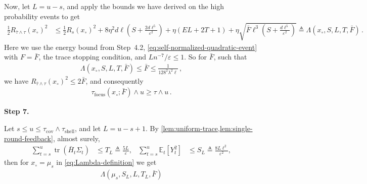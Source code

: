 \documentclass{article}
\newcommand{\proofstepinline}[1]{%
    {\normalfont\normalsize\bfseries\color{blue!55!black}Step #1.}\enspace
}
\newcommand{\E}{\mathbb E}
\newcommand{\tr}{\operatorname{tr}}
\newcommand{\1}{\mathbf 1}
\newcommand{\eps}{\varepsilon}
\begin{document}
Now, let $L = u - s$, and apply the bounds we have derived on the high probability events  to get
\begin{align}
    \frac{1}{2}R_{\bar{\tau}\wedge\tau}(x_{\circ})^2
     & \leq
    \frac{1}{2}R_s(x_{\circ})^2
    +8\eta^2d\ell\left(S+\frac{2d\ell^5}{\eps^2}\right)
    +\eta(EL+2T+1)
    +\eta\sqrt{\bar{F}\ell^3\left(S+\frac{d\ell^5}{\eps^2}\right)}
    \triangleq \Lambda(x_{\circ}, S, L, T, \bar{F})
    \,.
    \label{eq:Lambda-definition}
\end{align}
Here we use the energy bound from Step~4.2,
\eqref{eq:self-normalized-quadratic-event} with $F=\bar{F}$,
the trace stopping condition, and $Ln^{-7}/\eps\leq1$.
So for $\bar{F}$, such that
\begin{align}
    \Lambda(x_{\circ}, S, L, T, \bar{F})\leq \bar{F} \leq \frac{1}{128^2\lambda^2 \ell}\,,
\end{align}
we have $R_{\bar{\tau}\wedge \tau}(x_{\circ})^2 \leq 2\bar{F}$, and consequently
\begin{align}
    \tau_{\mathrm{focus}}(x_{\circ}; \bar{F}) \wedge u \geq \tau \wedge u\,.
\end{align}


\proofstepinline{7}
Let $s \leq u \leq \tau_{\mathrm{cov}} \wedge \tau_{\mathrm{shell}}$,
and let $L = u - s + 1$.
By \cref{lem:uniform-trace,lem:single-round-feedback}, almost surely,
\begin{align}
    \sum_{t=s}^{u}\tr(\bar{H}_t\Sigma_t)
     & \leq T_L\triangleq\frac{5L}{\eps},
     & \sum_{t=s}^{u}\E_t[Y_t^2]
     & \leq S_L\triangleq\frac{8L\ell^2}{\eps^2},
    \label{eq:confinement-local-budget}
\end{align}
then for $x_{\circ} = \mu_s$ in \eqref{eq:Lambda-definition} we get
\begin{align}
    \Lambda(\mu_s, S_L, L, T_L, \bar{F})
\end{align}
\end{document}
